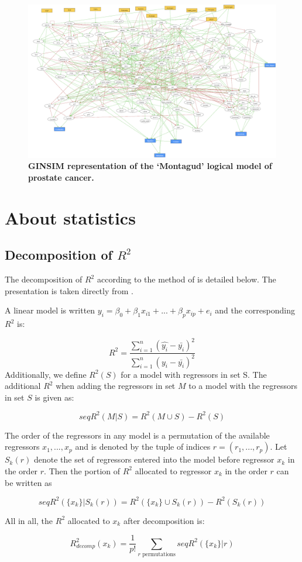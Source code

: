 \documentclass[a4paper,12pt,twoside,onecolumn,openright,final,oldfontcommands]{memoir}
\begin{document}
\begin{figure}

{\centering \includegraphics[width=0.9\linewidth]{fig/Montagud} 

}

\caption[Graphical abstract of PROFILE method to personalize logical models with omics data]{\textbf{GINSIM representation of the `Montagud'
logical model of prostate cancer.}}\label{fig:Montagud}
\end{figure}




\chapter{About statistics}\label{about-statistics}

\section{\texorpdfstring{Decomposition of
\(R^2\)}{Decomposition of R\^{}2}}\label{appendix-decomp}

The decomposition of \(R^2\) according to the method of
\citet{lindeman1980introduction} is detailed below. The presentation is
taken directly from \citet{gromping2006relative}.

A linear model is written
\(y_i=\beta_0+\beta_1x_{i1}+...+\beta_px_{ip}+e_i\) and the
corresponding \(R^2\) is:

\[R^2=\dfrac{\sum_{i=1}^{n} (\hat{y_i}-\bar{y_i})^2}{\sum_{i=1}^{n}  (y_i-\bar{y_i})^2}\]
Additionally, we define \(R^2(S)\) for a model with regressors in set S.
The additional \(R^2\) when adding the regressors in set \(M\) to a
model with the regressors in set \(S\) is given as:

\[seqR^2(M|S)=R^2(M\cup S)-R^2(S)\]

The order of the regressors in any model is a permutation of the
available regressors \(x_1, ..., x_p\) and is denoted by the tuple of
indices \(r = (r_1, ..., r_p)\). Let \(S_k(r)\) denote the set of
regressors entered into the model before regressor \(x_k\) in the order
\(r\). Then the portion of \(R^2\) allocated to regressor \(x_k\) in the
order \(r\) can be written as

\[seqR^2(\{x_k\}|S_k(r))=R^2(\{x_k\}\cup S_k(r))-R^2(S_k(r))\]

All in all, the \(R^2\) allocated to \(x_k\) after decomposition is:

\[R^2_{decomp}(x_k)=\dfrac{1}{p!}\sum_{r\text{ permutations}}seqR^2(\{x_k\}|r)\]


\end{document}
